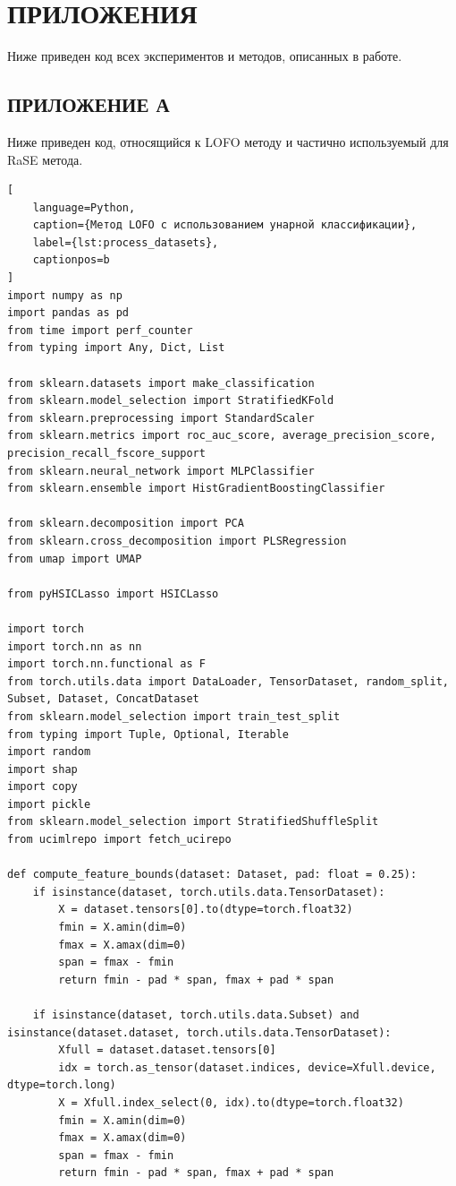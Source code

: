 \documentclass[12pt,a4paper]{article}
\begin{document}
\section*{ПРИЛОЖЕНИЯ}

Ниже приведен код всех экспериментов и методов, описанных в работе.

\subsection*{ПРИЛОЖЕНИЕ А}

Ниже приведен код, относящийся к LOFO методу и частично используемый для RaSE метода.

\begin{lstlisting}[
    language=Python,
    caption={Метод LOFO с использованием унарной классификации},
    label={lst:process_datasets},
    captionpos=b
]
import numpy as np
import pandas as pd
from time import perf_counter
from typing import Any, Dict, List

from sklearn.datasets import make_classification
from sklearn.model_selection import StratifiedKFold
from sklearn.preprocessing import StandardScaler
from sklearn.metrics import roc_auc_score, average_precision_score, precision_recall_fscore_support
from sklearn.neural_network import MLPClassifier
from sklearn.ensemble import HistGradientBoostingClassifier

from sklearn.decomposition import PCA
from sklearn.cross_decomposition import PLSRegression
from umap import UMAP

from pyHSICLasso import HSICLasso

import torch
import torch.nn as nn
import torch.nn.functional as F
from torch.utils.data import DataLoader, TensorDataset, random_split, Subset, Dataset, ConcatDataset
from sklearn.model_selection import train_test_split
from typing import Tuple, Optional, Iterable
import random
import shap
import copy
import pickle  
from sklearn.model_selection import StratifiedShuffleSplit
from ucimlrepo import fetch_ucirepo

def compute_feature_bounds(dataset: Dataset, pad: float = 0.25):
    if isinstance(dataset, torch.utils.data.TensorDataset):
        X = dataset.tensors[0].to(dtype=torch.float32)
        fmin = X.amin(dim=0)
        fmax = X.amax(dim=0)
        span = fmax - fmin
        return fmin - pad * span, fmax + pad * span

    if isinstance(dataset, torch.utils.data.Subset) and isinstance(dataset.dataset, torch.utils.data.TensorDataset):
        Xfull = dataset.dataset.tensors[0]
        idx = torch.as_tensor(dataset.indices, device=Xfull.device, dtype=torch.long)
        X = Xfull.index_select(0, idx).to(dtype=torch.float32)
        fmin = X.amin(dim=0)
        fmax = X.amax(dim=0)
        span = fmax - fmin
        return fmin - pad * span, fmax + pad * span


\end{lstlisting}
\end{document}
